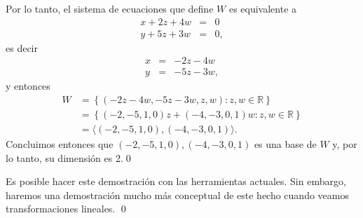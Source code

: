 \documentclass[handout]{beamer} %
\begin{document}
\begin{frame}
Por lo tanto, el sistema de ecuaciones que define $W$ es equivalente a 
\begin{equation*}
\begin{array}{rcl}
x  +2z +4w &=& 0 \\ y +5z +3w &=& 0,
\end{array}
\end{equation*}
es decir 
\begin{equation*}
\begin{array}{rcl}
x  &=& -2z - 4w  \\ y &=& -5z -3w ,
\end{array}
\end{equation*}
y entonces
\begin{align*}
W &= \left\{(-2z -4w,-5z -3w,z,w) : z,w\in \mathbb{R} \right\} \\
&= \left\{(-2,-5,1,0)z+(-4, -3,0,1)w : z,w\in \mathbb{R} \right\}\\
&= \langle (-2,-5,1,0),(-4, -3,0,1)\rangle.
\end{align*}
Concluimos entonces que $(-2,-5,1,0),(-4, -3,0,1)$  es una base de $W$ y, por lo tanto,  su dimensión es 2.\qed
\end{frame}

\begin{frame}

\begin{demostracion} Es posible hacer este demostración con las herramientas actuales. Sin embargo,  haremos una demostración mucho más conceptual de  este hecho  cuando veamos transformaciones lineales. 
    \qed   
    
\end{demostracion}

\end{frame}
\end{document}
